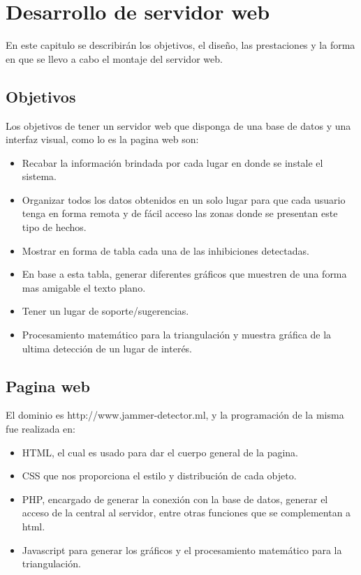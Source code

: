 \chapter{Desarrollo de servidor web}
\par En este capitulo se describirán los objetivos, el diseño, las prestaciones y la forma en que se llevo a cabo el montaje del servidor web.
\section{Objetivos}
\par Los objetivos de tener un servidor web que disponga de una base de datos y una interfaz visual, como lo es la pagina web son:

    \begin{itemize}
        \item Recabar la información brindada por cada lugar en donde se instale el sistema.
        \item Organizar todos los datos obtenidos en un solo lugar para que cada usuario tenga en forma remota y de fácil acceso las zonas donde se presentan este tipo de hechos. 
        \item Mostrar en forma de tabla cada una de las inhibiciones detectadas.
        \item En base a esta tabla, generar diferentes gráficos que muestren de una forma mas amigable el texto plano.
        \item Tener un lugar de soporte/sugerencias.
        \item Procesamiento matemático para la triangulación y muestra gráfica de la ultima detección de un lugar de interés. 
    \end{itemize}

\section{Pagina web}
El dominio es http://www.jammer-detector.ml, y la programación de la misma fue realizada en:
\begin{itemize}
    \item HTML, el cual es usado para dar el cuerpo general de la pagina.
    \item CSS que nos proporciona el estilo y distribución de cada objeto.
    \item PHP, encargado de generar la conexión con la base de datos, generar el acceso de la central al servidor, entre otras funciones que se complementan a html.
    \item Javascript para generar los gráficos y el procesamiento matemático para la triangulación.
\end{itemize}

